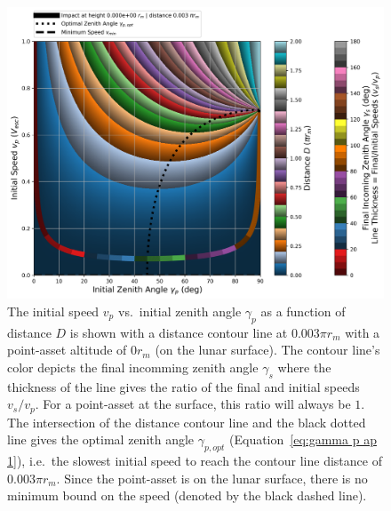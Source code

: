 \documentclass{article}
\begin{document}
\clearpage
{}

\begin{figure}[!htb]
	\centering
	\includegraphics[width=1.00\linewidth]{dist_speed_zenith_plot_000_0.000e+00_0.010.png}
	\caption{The initial speed $v_p$ vs.\ initial zenith angle $\gamma_p$ as a function of distance $D$ is shown with a distance contour line at $0.003\pi r_m$ with a point-asset altitude of $0 r_m$ (on the lunar surface). The contour line's color depicts the final incomming zenith angle $\gamma_s$ where the thickness of the line gives the ratio of the final and initial speeds $v_s/v_p$. For a point-asset at the surface, this ratio will always be $1$. The intersection of the distance contour line and the black dotted line gives the optimal zenith angle $\gamma_{p,opt}$ (Equation~\eqref{eq:gamma p ap 1}), i.e.\ the slowest initial speed to reach the contour line distance of $0.003\pi r_m$. Since the point-asset is on the lunar surface, there is no minimum bound on the speed (denoted by the black dashed line).
	}\label{fig:dist_speed_zenith_plot_000_0.000e+00_0.010}
\end{figure}
\end{document}
